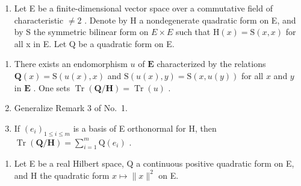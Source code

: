 
\begin{enumerate}
\def\labelenumi{\arabic{enumi})}
\tightlist
\item
  Let E be a finite-dimensional vector space over a commutative field of characteristic \(\neq 2\) . Denote by H a nondegenerate quadratic form on E, and by S the symmetric bilinear form on \(E \times E\) such that \(\mathrm{H}(x) = \mathrm{S}(x, x)\) for all x in E. Let Q be a quadratic form on E.
\end{enumerate}

\begin{enumerate}
\def\labelenumi{\alph{enumi})}
\item
  There exists an endomorphism \(u\) of \(\mathbf{E}\) characterized by the relations \(\mathbf{Q}(x) = \mathrm{S}(u(x), x)\) and \(\mathrm{S}(u(x), y) = \mathrm{S}(x, u(y))\) for all \(x\) and \(y\) in \(\mathbf{E}\) . One sets \(\operatorname{Tr}(\mathbf{Q}/\mathbf{H}) = \operatorname{Tr}(u)\) .
\item
  Generalize Remark 3 of No.~1.
\item
  If \((e_i)_{1\leqslant i\leqslant m}\) is a basis of E orthonormal for H, then \(\operatorname{Tr}(\mathbf{Q}/\mathbf{H}) = \sum_{i=1}^{m}\mathrm{Q}(e_i)\) .
\end{enumerate}

\begin{enumerate}
\def\labelenumi{\arabic{enumi})}
\setcounter{enumi}{1}
\tightlist
\item
  Let E be a real Hilbert space, Q a continuous positive quadratic form on E, and H the quadratic form \(x \mapsto \|x\|^2\) on E.
\end{enumerate}

